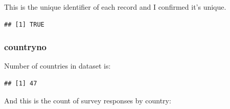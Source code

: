 \documentclass[
]{article}
\newenvironment{Shaded}{\begin{snugshade}}{\end{snugshade}}
\newcommand{\FunctionTok}[1]{\textcolor[rgb]{0.13,0.29,0.53}{\textbf{#1}}}
\newcommand{\NormalTok}[1]{#1}
\newcommand{\SpecialCharTok}[1]{\textcolor[rgb]{0.81,0.36,0.00}{\textbf{#1}}}
\begin{document}
This is the unique identifier of each record and I confirmed it's
unique.

\begin{Shaded}
\end{Shaded}

\begin{verbatim}
## [1] TRUE
\end{verbatim}

\subsubsection{countryno}\label{countryno}

Number of countries in dataset is:

\begin{Shaded}
\end{Shaded}

\begin{verbatim}
## [1] 47
\end{verbatim}

And this is the count of survey responses by country:
\end{document}
